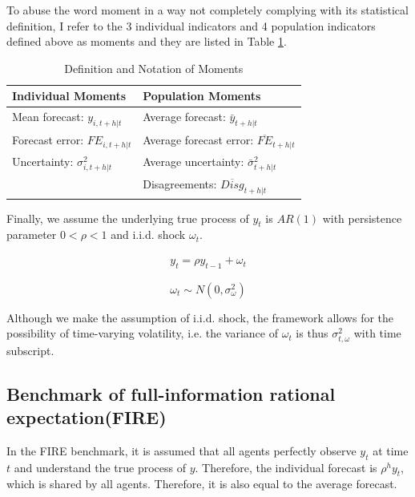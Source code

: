 \documentclass[12pt]{article}
\begin{document}
	To abuse the word moment in a way not completely complying with its statistical definition, I refer to the 3 individual indicators and 4 population indicators defined above as moments and they are  listed in Table \ref{MomSum}.
	
	\begin{table}[ht]
		\centering
		\caption{Definition and Notation of Moments}
		\label{MomSum}
		\begin{tabular}{ll}
			
			\hline 
			Individual Moments                                  & Population Moments                             \\
			\hline 
			Mean forecast: $y_{i,t+h|t}$                   & Average forecast: $\bar y_{t+h|t}$                   \\
			Forecast error: $FE_{i,t+h|t}$ & Average forecast error: $\overline{FE}_{t+h|t}$ \\
			Uncertainty: $\sigma^2_{i,t+h|t}$         & Average uncertainty:  $\bar \sigma^2_{t+h|t}$ \\
			& Disagreements:  $\overline{Disg}_{t+h|t}$       \\
			\hline 
		\end{tabular}
	\end{table}
	
	Finally, we assume the underlying true process of $y_{t}$ is $AR(1)$ with persistence parameter $0<\rho <1$ and i.i.d. shock $\omega_t$. 
	
	\begin{eqnarray}\label{AR_process}
		y_{t} = \rho y_{t-1} + \omega_t
	\end{eqnarray}
	
	$$\omega_t \sim N(0,\sigma^2_{\omega})$$
	
	Although we make the assumption of i.i.d. shock, the framework allows for the possibility of time-varying volatility, i.e. the variance of $\omega_t$ is thus $\sigma^2_{t,\omega}$ with time subscript. 
	
	\subsection{Benchmark of full-information rational expectation(FIRE)}
	
	In the FIRE benchmark,  it is assumed that all agents perfectly observe $y_t$ at time $t$ and understand the true process of $y$. Therefore, the individual forecast is $\rho^h y_t $, which is shared by all agents. Therefore, it is also equal to the average forecast. 
	
\end{document}
